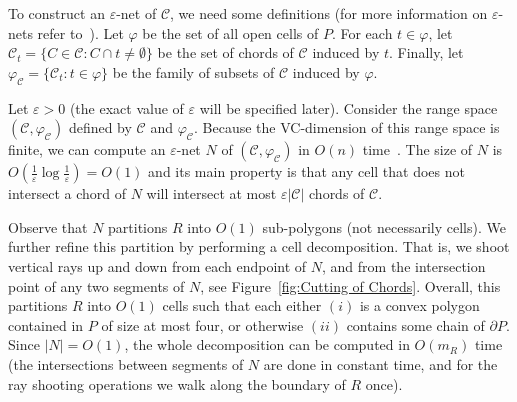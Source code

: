 \documentclass[a4paper,UKenglish]{lipics}
\newcommand{\m}{\ensuremath{m_{\scriptscriptstyle R}}}
\begin{document}
To construct an $\varepsilon$-net of $\mathcal C$, we need some definitions (for more information on $\varepsilon$-nets refer to~\cite{ConstructionEpsilonNets}).
Let $\varphi$ be the set of all open cells of $P$.
For each $t\in \varphi$, let $\mathcal C_t = \{C\in \mathcal C: C\cap t \neq \emptyset\}$ be the set of chords of $\mathcal C$ induced by $t$. 
Finally, let $\varphi_\mathcal C = \{\mathcal C_t : t\in \varphi\}$ be the family of subsets of $\mathcal C$ induced by $\varphi$.

Let $\varepsilon >0$ (the exact value of $\varepsilon$ will be specified later).
Consider the range space $(\mathcal C, \varphi_\mathcal C)$ defined by $\mathcal C$ and $\varphi_\mathcal C$. 
Because the VC-dimension of this range space is finite, we can compute an $\varepsilon$-net $N$ of $(\mathcal C, \varphi_\mathcal C)$ in $O(n)$ time~\cite{ConstructionEpsilonNets}. 
The size of $N$ is $O(\frac{1}{\varepsilon} \log \frac{1}{\varepsilon}) = O(1)$ and its main property is that any cell that does not intersect a chord of $N$ will intersect at most $\varepsilon |\mathcal C|$ chords of $\mathcal C$. 

Observe that $N$ partitions $R$ into $O(1)$ sub-polygons (not necessarily cells). We further refine this partition by performing a cell decomposition. That is, we shoot vertical rays up and down from each endpoint of $N$, and from the intersection point of  any two segments of $N$, see Figure~\ref{fig:Cutting of Chords}. Overall, this partitions $R$ into $O(1)$ cells such that each  either $(i)$  is a convex polygon contained in $P$ of size at most four, or otherwise $(ii)$ contains some chain of $\partial P$. 
Since $|N| = O(1)$, the whole decomposition can be computed in $O(\m)$ time (the intersections between segments of $N$ are done in constant time, and for the ray shooting operations we walk along the boundary of $R$ once).
\end{document}
